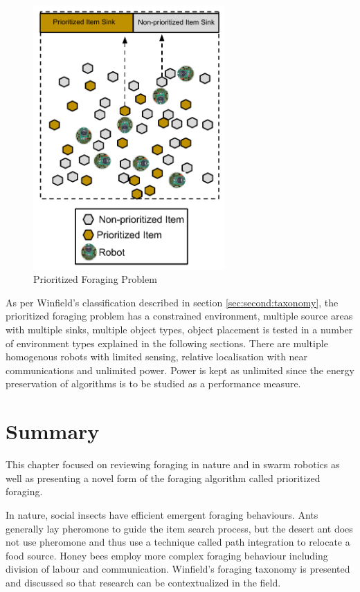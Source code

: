\begin{figure} [h]
	\centering
	\includegraphics[width=0.65\textwidth]{chapters/chapter2/figures/EpuckGoldMining.pdf}
	\caption{Prioritized Foraging Problem }
	\label{prioritizedforaging}
\end{figure}

As per Winfield's classification described in section \ref{sec:second:taxonomy}, the prioritized foraging problem has a constrained environment, multiple source areas with multiple sinks, multiple object types, object placement is tested in a number of environment types explained in the following sections. There are multiple homogenous robots with limited sensing, relative localisation with near communications and unlimited power. Power is kept as unlimited since the energy preservation of algorithms is to be studied as a performance measure. 

\section{Summary}
\label{foraging:summary}

This chapter focused on reviewing foraging in nature and in swarm robotics as well as presenting a novel form of the foraging algorithm called prioritized foraging. 

In nature, social insects have efficient emergent foraging behaviours. Ants generally lay pheromone to guide the item search process, but the desert ant does not use pheromone and thus use a technique called path integration to relocate a food source. Honey bees employ more complex foraging behaviour including division of labour and communication. Winfield's foraging taxonomy is presented and discussed so that research can be contextualized in the field. 

